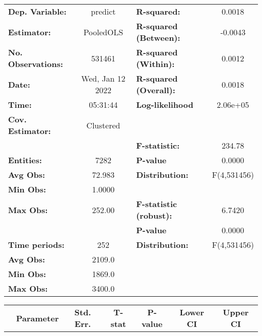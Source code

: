 \begin{center}
\begin{tabular}{lclc}
\toprule
\textbf{Dep. Variable:}    &      predict       & \textbf{  R-squared:         }   &      0.0018      \\
\textbf{Estimator:}        &     PooledOLS      & \textbf{  R-squared (Between):}  &     -0.0043      \\
\textbf{No. Observations:} &       531461       & \textbf{  R-squared (Within):}   &      0.0012      \\
\textbf{Date:}             &  Wed, Jan 12 2022  & \textbf{  R-squared (Overall):}  &      0.0018      \\
\textbf{Time:}             &      05:31:44      & \textbf{  Log-likelihood     }   &     2.06e+05     \\
\textbf{Cov. Estimator:}   &     Clustered      & \textbf{                     }   &                  \\
\textbf{}                  &                    & \textbf{  F-statistic:       }   &      234.78      \\
\textbf{Entities:}         &        7282        & \textbf{  P-value            }   &      0.0000      \\
\textbf{Avg Obs:}          &       72.983       & \textbf{  Distribution:      }   &   F(4,531456)    \\
\textbf{Min Obs:}          &       1.0000       & \textbf{                     }   &                  \\
\textbf{Max Obs:}          &       252.00       & \textbf{  F-statistic (robust):} &      6.7420      \\
\textbf{}                  &                    & \textbf{  P-value            }   &      0.0000      \\
\textbf{Time periods:}     &        252         & \textbf{  Distribution:      }   &   F(4,531456)    \\
\textbf{Avg Obs:}          &       2109.0       & \textbf{                     }   &                  \\
\textbf{Min Obs:}          &       1869.0       & \textbf{                     }   &                  \\
\textbf{Max Obs:}          &       3400.0       & \textbf{                     }   &                  \\
\bottomrule
\end{tabular}
\begin{tabular}{lcccccc}
                & \textbf{Parameter} & \textbf{Std. Err.} & \textbf{T-stat} & \textbf{P-value} & \textbf{Lower CI} & \textbf{Upper CI}  \\

\end{tabular}
\end{center}
